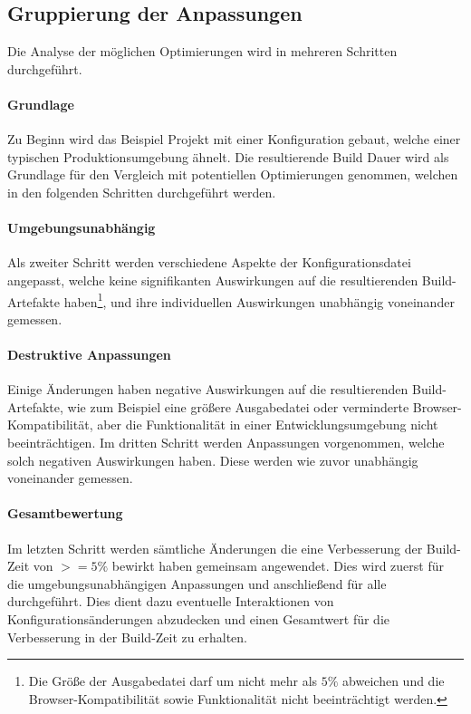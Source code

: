 \documentclass[11pt]{report}
\begin{document}
			\subsection{Gruppierung der Anpassungen}
				Die Analyse der möglichen Optimierungen wird in mehreren Schritten durchgeführt.
				\paragraph{Grundlage}\label{baseline-build} Zu Beginn wird das Beispiel Projekt mit einer Konfiguration gebaut, welche einer typischen Produktionsumgebung ähnelt. Die resultierende Build Dauer wird als Grundlage für den Vergleich mit potentiellen Optimierungen genommen, welchen in den folgenden Schritten durchgeführt werden.

				\paragraph{Umgebungsunabhängig} Als zweiter Schritt werden verschiedene Aspekte der Konfigurationsdatei angepasst, welche keine signifikanten Auswirkungen auf die resultierenden Build-Artefakte haben\footnote{Die Größe der Ausgabedatei darf um nicht mehr als $5\%$ abweichen und die Browser-Kompatibilität sowie Funktionalität nicht beeinträchtigt werden.}, und ihre individuellen Auswirkungen unabhängig voneinander gemessen.

				\paragraph{Destruktive Anpassungen} Einige Änderungen haben negative Auswirkungen auf die resultierenden Build-Artefakte, wie zum Beispiel eine größere Ausgabedatei oder verminderte Browser-Kompatibilität, aber die Funktionalität in einer Entwicklungsumgebung nicht beeinträchtigen. Im dritten Schritt werden Anpassungen vorgenommen, welche solch negativen Auswirkungen haben. Diese werden wie zuvor unabhängig voneinander gemessen.

				\paragraph{Gesamtbewertung} Im letzten Schritt werden sämtliche Änderungen die eine Verbesserung der Build-Zeit von $>=5\%$ bewirkt haben gemeinsam angewendet. Dies wird zuerst für die umgebungsunabhängigen Anpassungen und anschließend für alle durchgeführt. Dies dient dazu eventuelle Interaktionen von Konfigurationsänderungen abzudecken und einen Gesamtwert für die Verbesserung in der Build-Zeit zu erhalten.
\end{document}
